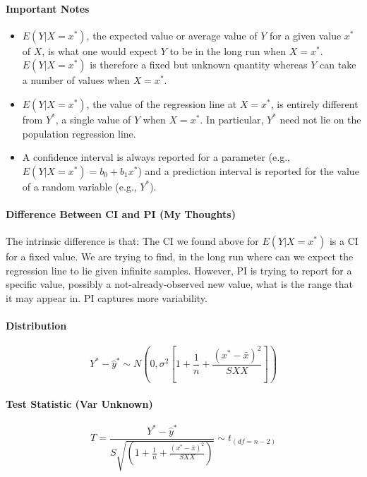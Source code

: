\documentclass[10pt]{article}
\begin{document}
\paragraph{Important Notes}
\begin{itemize}
    \item $E(Y | X = x^*)$, the expected value or average value of $Y$ for a given value $x^*$ of $X$, is what one would expect $Y$ to be in the long run when $X = x^*$. $E(Y | X = x^*)$ is therefore a fixed but unknown quantity whereas $Y$ can take a number of values when $X = x^*$.
    \item $E(Y | X = x^*)$, the value of the regression line at $X = x^*$, is entirely different from $Y^*$, a single value of $Y$ when $X = x^*$. In particular, $Y^*$ need not lie on the population regression line.
    \item A confidence interval is always reported for a parameter (e.g., $E(Y | X = x^*) = b_0 + b_1x^*$) and a prediction interval is reported for the value of a random variable (e.g., $Y^*$).
\end{itemize}

\paragraph{Difference Between CI and PI (My Thoughts)} The intrinsic difference is that: The CI we found above for $E(Y | X = x^*)$ is a CI for a fixed value. We are trying to find, in the long run where can we expect the regression line to lie given infinite samples. However, PI is trying to report for a specific value, possibly a not-already-observed new value, what is the range that it may appear in. PI captures more variability. 

\paragraph{Distribution}
\begin{equation*}
    Y^{*}-\hat{y}^{*} \sim N\left(0, \sigma^{2}\left[1+\frac{1}{n}+\frac{\left(x^{*}-\bar{x}\right)^{2}}{S X X}\right]\right)
\end{equation*}

\paragraph{Test Statistic (Var Unknown)}
\begin{equation*}
    T=\frac{Y^*-\hat{y}^*}{S \sqrt{\left(1+\frac{1}{n}+\frac{\left(x^{*}-\bar{x}\right)^{2}}{S X X}\right)}} \sim t_{(df = n-2)}
\end{equation*}
\end{document}
